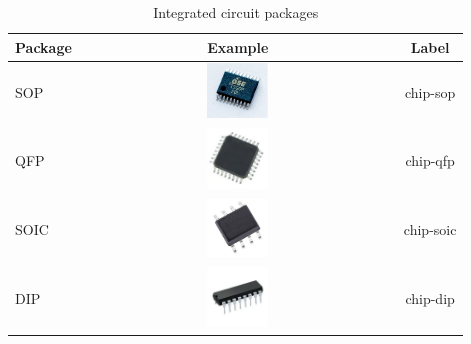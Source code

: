 \documentclass[preprint,12pt,3p,times]{elsarticle}
\begin{document}
\begin{minipage}[h]{0.48\textwidth}
	\centering
	\begin{table}[H]
	\centering
	\begin{tabular}{|l|c|c|}
	\hline
	\textbf{Package} & \textbf{Example} & \textbf{Label} \\ \hline
	SOP & \includegraphics[width=0.2\textwidth]{images/sop.jpg} & chip-sop \\ \hline
	QFP & \includegraphics[width=0.2\textwidth]{images/qfp32.jpg} & chip-qfp \\ \hline
	SOIC & \includegraphics[width=0.2\textwidth]{images/soic8.jpg} & chip-soic \\ \hline
	DIP & \includegraphics[width=0.2\textwidth]{images/dip16.jpg} & chip-dip \\ \hline
	\end{tabular}
	\caption{Integrated circuit packages}
	\label{tab:ic_packages}
	\end{table}
\end{minipage}%
\hfill
\end{document}
